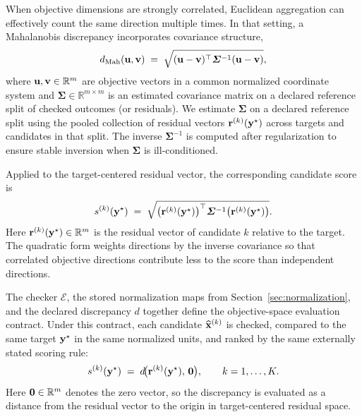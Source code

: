 When objective dimensions are strongly correlated, Euclidean aggregation can effectively count the same
direction multiple times. In that setting, a Mahalanobis discrepancy incorporates covariance
structure, \cite{Mahalanobis1936,DeMaesschalck2000}
\begin{equation}
  d_{\mathrm{Mah}}(\mathbf{u},\mathbf{v})
  \;=\;
  \sqrt{(\mathbf{u}-\mathbf{v})^{\top}\boldsymbol{\Sigma}^{-1}(\mathbf{u}-\mathbf{v})},
  \label{eq:mahalanobis_distance}
\end{equation}
where $\mathbf{u},\mathbf{v}\in\mathbb{R}^m$ are objective vectors in a common normalized coordinate system
and $\boldsymbol{\Sigma}\in\mathbb{R}^{m\times m}$ is an estimated covariance matrix on a declared
reference split of checked outcomes (or residuals). We estimate $\boldsymbol{\Sigma}$ on a declared
reference split using the pooled collection of residual vectors $\mathbf{r}^{(k)}(\mathbf{y}^{\star})$
across targets and candidates in that split. The inverse $\boldsymbol{\Sigma}^{-1}$ is computed after
regularization to ensure stable inversion when $\boldsymbol{\Sigma}$ is ill-conditioned.

Applied to the target-centered residual vector, the corresponding candidate score is
\begin{equation}
  s^{(k)}(\mathbf{y}^{\star})
  \;=\;
  \sqrt{
  \big(\mathbf{r}^{(k)}(\mathbf{y}^{\star})\big)^{\top}
  \boldsymbol{\Sigma}^{-1}
  \big(\mathbf{r}^{(k)}(\mathbf{y}^{\star})\big)}.
  \label{eq:discrepancy_residual_mahal}
\end{equation}
Here $\mathbf{r}^{(k)}(\mathbf{y}^{\star})\in\mathbb{R}^m$ is the residual vector of candidate $k$ relative
to the target. The quadratic form weights directions by the inverse covariance so that correlated
objective directions contribute less to the score than independent directions.

The checker $\mathcal{E}$, the stored normalization maps from Section~\ref{sec:normalization}, and the
declared discrepancy $d$ together define the objective-space evaluation contract. Under this contract,
each candidate $\widehat{\mathbf{x}}^{(k)}$ is checked, compared to the same target $\mathbf{y}^{\star}$ in
the same normalized units, and ranked by the same externally stated scoring rule:
\begin{equation}
  s^{(k)}(\mathbf{y}^{\star})
  \;=\;
  d\!\big(\mathbf{r}^{(k)}(\mathbf{y}^{\star}),\,\mathbf{0}\big),
  \qquad k=1,\dots,K.
  \label{eq:per_candidate_discrepancy}
\end{equation}
Here $\mathbf{0}\in\mathbb{R}^m$ denotes the zero vector, so the discrepancy is evaluated as a distance
from the residual vector to the origin in target-centered residual space.

